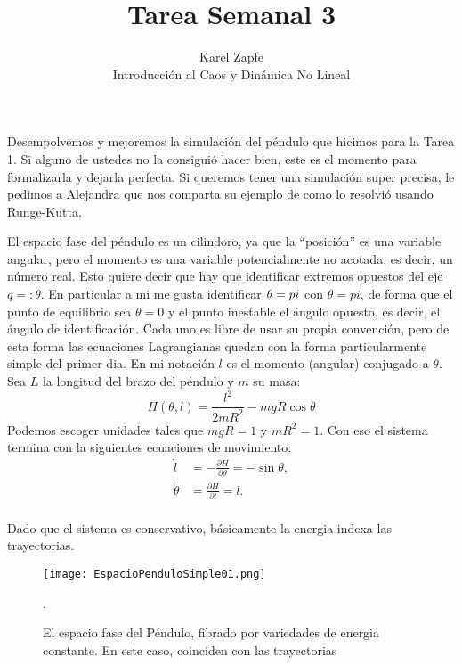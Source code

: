 \documentclass[12pt]{article}
\begin{document}
 
 
\title{Tarea Semanal 3}%
\author{Karel Zapfe\\ %
Introducción al Caos y Dinámica No Lineal} %
 
\maketitle

Desempolvemos y mejoremos la simulación del péndulo que hicimos para la Tarea 1.
Si alguno de ustedes no la consiguió hacer bien, este es el momento para
formalizarla y dejarla perfecta. Si queremos tener una simulación
super precisa, le pedimos a Alejandra que nos comparta  su ejemplo de como lo resolvió usando
Runge-Kutta. 

El espacio fase del péndulo es un cilindoro, ya que la ``posición'' es una variable angular,
pero el momento es una variable potencialmente no acotada, es decir, un número real. 
Esto quiere decir que hay que identificar extremos opuestos del eje $q=:\theta$. 
En particular a mi me gusta identificar $\theta=\-pi$ con $\theta=pi$, de forma que el punto
de equilibrio sea $\theta=0$  y el punto inestable el ángulo opuesto, es decir,
el ángulo de identificación. Cada uno es libre de usar su propia convención, pero
de esta forma las ecuaciones Lagrangianas quedan con la forma particularmente simple 
del primer dia. En mi notación $l$ es el momento (angular) conjugado a $\theta$. Sea
$L$ la longitud del brazo del péndulo y $m$ su masa:
\begin{equation}
H(\theta, l)= \frac{l^2}{2m R^2}-mgR \cos\theta
\end{equation}
Podemos escoger unidades tales que $mgR=1$ y $mR^2=1$. Con eso el sistema termina con 
la siguientes ecuaciones de movimiento:
\begin{align}
\dot{l} & = -\frac{\partial H}{\partial \theta}  =  -\sin \theta, \\
\dot{\theta} & = \frac{\partial H}{\partial l} = l. \\
\end{align}

Dado que el sistema es conservativo, básicamente la energia indexa las trayectorias.

\begin{figure}[H]
\begin{center}
\texttt{[image: EspacioPenduloSimple01.png]}
\end{center}
\caption{ El espacio fase del Péndulo, fibrado por variedades de energia constante.
En este caso, coinciden con las trayectorias}.
\end{figure}
\end{document}
